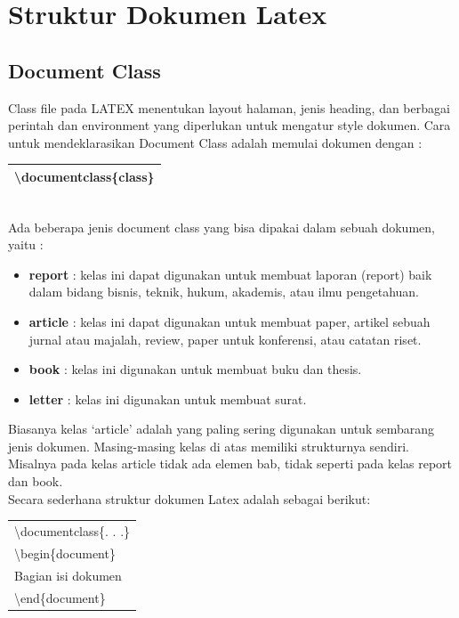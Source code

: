 \section{Struktur Dokumen Latex}
\subsection{Document Class}
Class file pada LATEX menentukan layout halaman, jenis heading, dan berbagai perintah dan environment yang diperlukan untuk mengatur style dokumen. Cara untuk mendeklarasikan Document Class adalah memulai dokumen dengan :\\[0.5 cm]
\begin{tabular}{|p{13.5 cm}|}
\hline
\textbackslash documentclass\{class\}\\
\hline
\end{tabular}\\[0.5 cm]
Ada beberapa jenis document class yang bisa dipakai dalam sebuah dokumen, yaitu :
\begin{itemize}
\item {\bf report} : kelas ini dapat digunakan untuk membuat laporan (report) baik dalam bidang
bisnis, teknik, hukum, akademis, atau ilmu pengetahuan.
\item  {\bf article} : kelas ini dapat digunakan untuk membuat paper, artikel sebuah jurnal atau
majalah, review, paper untuk konferensi, atau catatan riset.
\item {\bf book} : kelas ini digunakan untuk membuat buku dan thesis.
\item {\bf letter} : kelas ini digunakan untuk membuat surat.
\end{itemize}
Biasanya kelas ‘article’ adalah yang paling sering digunakan untuk sembarang jenis dokumen. Masing-masing kelas di atas memiliki strukturnya sendiri. Misalnya pada kelas article tidak ada elemen bab, tidak seperti pada kelas report dan book.\\[0.5 cm]
\vspace{0.5 cm}
Secara sederhana struktur dokumen  Latex adalah sebagai berikut:\\
\begin{tabular}{|p{13.5 cm}|}
\hline
\textbackslash documentclass\{. . .\}\\
\textbackslash begin\{document\}\\
      Bagian isi dokumen\\
\textbackslash end\{document\}\\
\hline
\end{tabular}
